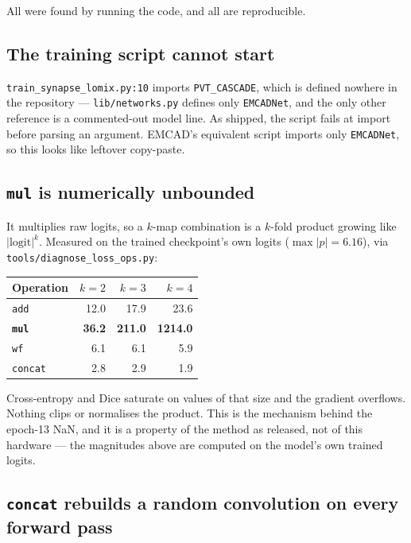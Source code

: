 \documentclass[11pt,a4paper]{article}
\newcommand{\code}[1]{\texttt{\small #1}}
\begin{document}
All were found by running the code, and all are reproducible.

\subsection{The training script cannot start}

\code{train\_synapse\_lomix.py:10} imports \code{PVT\_CASCADE}, which is defined
nowhere in the repository --- \code{lib/networks.py} defines only
\code{EMCADNet}, and the only other reference is a commented-out model line. As
shipped, the script fails at import before parsing an argument. EMCAD's
equivalent script imports only \code{EMCADNet}, so this looks like leftover
copy-paste.

\subsection{\code{mul} is numerically unbounded}

It multiplies raw logits, so a $k$-map combination is a $k$-fold product growing
like $|\text{logit}|^k$. Measured on the trained checkpoint's own logits
($\max |p| = 6.16$), via \code{tools/diagnose\_loss\_ops.py}:

\begin{center}
\begin{tabular}{@{}lrrr@{}}
\toprule
\textbf{Operation} & $k=2$ & $k=3$ & $k=4$ \\
\midrule
\code{add} & 12.0 & 17.9 & 23.6 \\
\textbf{\code{mul}} & \textbf{36.2} & \textbf{211.0} & \textbf{1214.0} \\
\code{wf} & 6.1 & 6.1 & 5.9 \\
\code{concat} & 2.8 & 2.9 & 1.9 \\
\bottomrule
\end{tabular}
\end{center}

Cross-entropy and Dice saturate on values of that size and the gradient
overflows. Nothing clips or normalises the product. This is the mechanism behind
the epoch-13 NaN, and it is a property of the method as released, not of this
hardware --- the magnitudes above are computed on the model's own trained
logits.

\subsection{\code{concat} rebuilds a random convolution on every forward pass}
\end{document}
